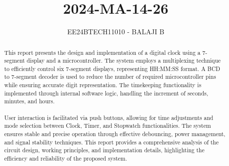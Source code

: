 \documentclass[journal]{IEEEtran}
\begin{document}

\vspace{3cm}

\title{2024-MA-14-26}
\author{EE24BTECH11010 - BALAJI B}
{\let\newpage\relax\maketitle}

\renewcommand{\thefigure}{\theenumi}
\renewcommand{\thetable}{\theenumi}
\setlength{\intextsep}{10pt} %
\renewcommand{\thetable}{\theenumi}

\begin{abstract}
    This report presents the design and implementation of a digital clock using a 7-segment display and a microcontroller. The system employs a multiplexing technique to efficiently control six 7-segment displays, representing HH:MM:SS format. A BCD to 7-segment decoder is used to reduce the number of required microcontroller pins while ensuring accurate digit representation. The timekeeping functionality is implemented through internal software logic, handling the increment of seconds, minutes, and hours. \\ \\
    User interaction is facilitated via push buttons, allowing for time adjustments and mode selection between Clock, Timer, and Stopwatch functionalities. The system ensures stable and precise operation through effective debouncing, power management, and signal stability techniques. This report provides a comprehensive analysis of the circuit design, working principles, and implementation details, highlighting the efficiency and reliability of the proposed system.
\end{abstract}

\end{document}
